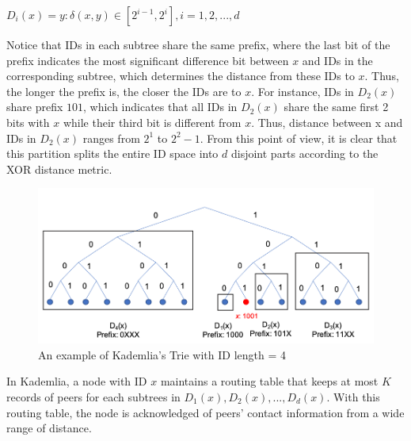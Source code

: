 \begin{center}
  $D_{i}(x) = {y: \delta(x,y) \in [2^{i-1}, 2^{i}]}, i = 1, 2, ..., d$
\end{center}

Notice that IDs in each subtree share the same prefix, where the last bit of the prefix indicates the most significant difference bit between $x$ and IDs in the corresponding subtree, which determines the distance from these IDs to $x$. Thus, the longer the prefix is, the closer the IDs are to $x$. For instance, IDs in $D_{2}(x)$ share prefix $101$, which indicates that all IDs in $D_{2}(x)$ share the same first 2 bits with $x$ while their third bit is different from $x$. Thus, distance between x and IDs in $D_{2}(x)$ ranges from $2^{1}$ to $2^{2}-1$. From this point of view, it is clear that this partition splits the entire ID space into $d$ disjoint parts according to the XOR distance metric.

\begin{figure}[hbt]
  \centering
    \includegraphics[width=13cm]{figures/bucket_trie.png}
    \caption{An example of Kademlia's Trie with ID length = 4}
    \label{fig:buckettrie}
\end{figure}

In Kademlia, a node with ID $x$ maintains a routing table that keeps at most $K$ records of peers for each subtrees in $D_{1}(x), D_{2}(x), ..., D_{d}(x)$. With this routing table, the node is acknowledged of peers' contact information from a wide range of distance.

